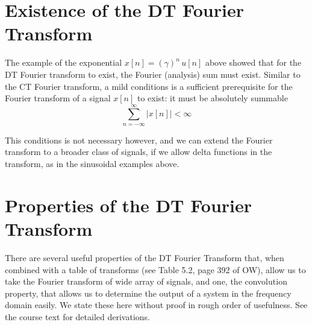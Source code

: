 \section{Existence of the DT Fourier Transform}

The example of the exponential $x[n] = \left(\gamma\right)^n\,u[n]$ above showed that for the DT Fourier transform to exist, the Fourier (analysis) sum must exist. Similar to the CT Fourier transform, a mild conditions is a sufficient prerequisite for the Fourier transform of a signal $x[n]$ to exist: it must be  absolutely summable
\[
\sum\limits_{n = -\infty}^{\infty} |x[n]| < \infty
\]

This conditions is not necessary however, and we can extend the Fourier transform to a broader class of signals, if we allow delta functions in the transform, as in the sinusoidal examples above. 

\section{Properties of the DT Fourier Transform}

There are several useful properties of the DT Fourier Transform that, when combined with a table of transforms (see Table 5.2, page 392 of OW), allow us to take the Fourier transform of  wide array of signals, and one, the convolution property, that allows us to determine the output of a system in the frequency domain easily. We state these here without proof in rough order of usefulness. See the course text for detailed derivations.

